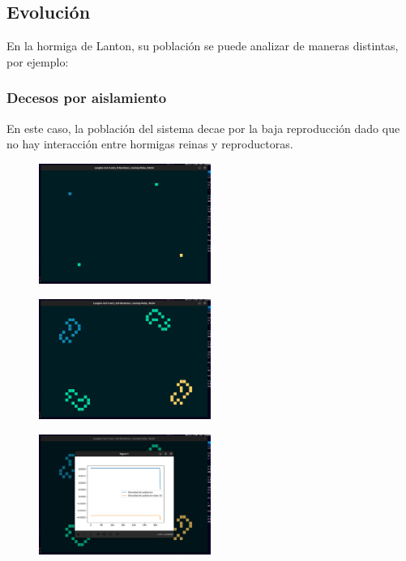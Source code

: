 \documentclass[10pt]{article}
\begin{document}
        \subsection*{Evolución}
        En la hormiga de Lanton, su población se puede analizar de maneras distintas, por ejemplo:
            \subsubsection{Decesos por aislamiento}
            En este caso, la población del sistema decae por la baja reproducción dado que no hay interacción entre hormigas reinas y reproductoras.
              \begin{figure}[h!]
                \centering
                \includegraphics[width=0.5\textwidth]{aislamiento1.png}
            \end{figure}\begin{figure}[h!]
                \centering
                \includegraphics[width=0.5\textwidth]{aislamiento2.png}
            \end{figure}\begin{figure}[h!]
                \centering
                \includegraphics[width=0.5\textwidth]{aislamiento3.png}
            \end{figure}
\end{document}
